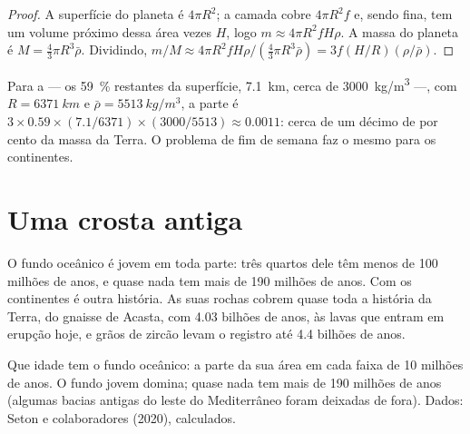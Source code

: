\begin{proof}
A superfície do planeta é $4\pi R^2$; a camada cobre $4\pi R^2 f$ e, sendo
fina, tem um volume próximo dessa área vezes $H$, logo $m \approx 4\pi R^2
f H \rho$. A massa do planeta é $M = \tfrac{4}{3}\pi R^3 \bar\rho$. Dividindo,
$m/M \approx 4\pi R^2 f H \rho / (\tfrac{4}{3}\pi R^3 \bar\rho) = 3 f (H/R)
(\rho/\bar\rho)$.
\end{proof}

Para a  --- os \qty{59}{\percent} restantes da superfície,
\qty{7.1}{km}, cerca de \qty{3000}{kg/m^3} ---, com $R = \qty{6371}{km}$ e
$\bar\rho = \qty{5513}{kg/m^3}$, a parte é $3 \times 0.59 \times
(7.1/6371) \times (3000/5513) \approx 0.0011$: cerca de um décimo de por
cento da massa da Terra. O problema de fim de semana faz o mesmo para os
continentes.

\section{Uma crosta antiga}

O fundo oceânico é jovem em toda parte: três quartos dele têm menos de 100
milhões de anos, e quase nada tem mais de 190 milhões de anos. Com os
continentes é outra história. As suas rochas cobrem quase toda a história
da Terra, do gnaisse de Acasta, com 4.03 bilhões de anos, às lavas que
entram em erupção hoje, e grãos de zircão levam o registro até 4.4 bilhões
de anos.

\begin{omfigure}

{\small Que idade tem o fundo oceânico: a parte da sua área em cada faixa
de 10 milhões de anos. O fundo jovem domina; quase nada tem mais de 190
milhões de anos (algumas bacias antigas do leste do Mediterrâneo foram
deixadas de fora). Dados: Seton e colaboradores (2020), calculados.}
\end{omfigure}


